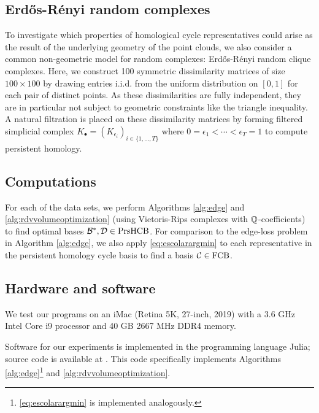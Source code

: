 \subsection{Erd\H{o}s-R\'enyi random complexes}\label{sec:erdos}

To investigate which properties of homological cycle representatives could arise as the result of the underlying geometry of the point clouds, we also consider a common non-geometric model for random complexes: Erd\H{o}s-R\'enyi random clique complexes. Here, we construct 100  symmetric dissimilarity matrices of size $100 \times 100$ by drawing entries i.i.d. from the uniform distribution on $[0,1]$ for each pair of distinct points. As these dissimilarities are fully independent, they are in particular not subject to geometric constraints like the triangle inequality. A natural filtration is placed on these dissimilarity matrices by forming filtered simplicial complex $K_\bullet = (K_{\epsilon_i})_{i \in\{ 1, \ldots, T\}}$ where $0=\epsilon_1 < \cdots < \epsilon_T=1$ to compute persistent homology.

\subsection{Computations}

For each of the data sets, we perform Algorithms \ref{alg:edge} and \ref{alg:rdvvolumeoptimization} (using Vietoris-Rips complexes with $\mathbb{Q}$-coefficients) to find optimal bases $\mathcal B^*, \mathcal D \in \mathrm{PrsHCB}$.  For comparison to the edge-loss problem in Algorithm \ref{alg:edge}, we also apply \pr \eqref{eq:escolarargmin} to each representative in the persistent homology cycle basis to find a basis $\mathcal{C} \in \mathrm{FCB}$.

\subsection{Hardware and software}
\label{subsec:hardwaresoftware}

We test our programs on an iMac (Retina 5K, 27-inch, 2019) with a 3.6 GHz Intel Core i9 processor and 40 GB 2667 MHz DDR4 memory.


Software for our experiments is implemented in the programming language Julia; source code is available at \cite{li_thompson}.  This code specifically implements Algorithms \ref{alg:edge}\footnote{ \pr \eqref{eq:escolarargmin} is implemented analogously.} and \ref{alg:rdvvolumeoptimization}.


